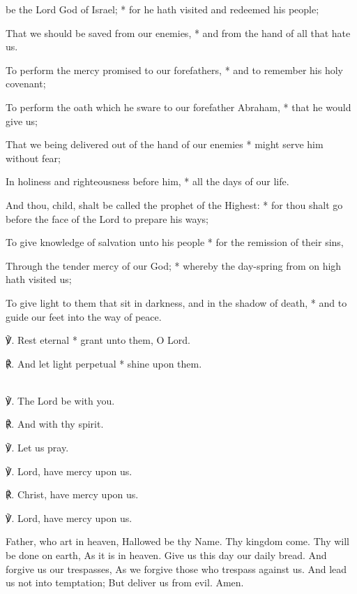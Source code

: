  {} be the Lord God of Israel; * for he hath visited and redeemed his people;\par
    That we should be saved from our enemies, * and from the hand of all that hate us.\par
    To perform the mercy promised to our forefathers, * and to remember his holy covenant;\par
    To perform the oath which he sware to our forefather Abraham, * that he would give us;\par
    That we being delivered out of the hand of our enemies * might serve him without fear;\par
    In holiness and righteousness before him, * all the days of our life.\par
    And thou, child, shalt be called the prophet of the Highest: * for thou shalt go before the face of the Lord to prepare his ways;\par
    To give knowledge of salvation unto his people * for the remission of their sins,\par
    Through the tender mercy of our God; * whereby the day-spring from on high hath visited us;\par
    To give light to them that sit in darkness, and in the shadow of death, * and to guide our feet into the way of peace.

℣. Rest eternal * grant unto them, O Lord.\par
℟. And let light perpetual * shine upon them.

\\

℣. The Lord be with you.

℟. And with thy spirit.

℣. Let us pray.

℣. Lord, have mercy upon us.

℟. Christ, have mercy upon us.

℣. Lord, have mercy upon us.

 Father, who art in heaven, Hallowed be thy Name. Thy kingdom come. Thy will be done on earth, As it is in heaven. Give us this day our daily bread. And forgive us our trespasses, As we forgive those who trespass against us. And lead us not into temptation; But deliver us from evil. Amen.

